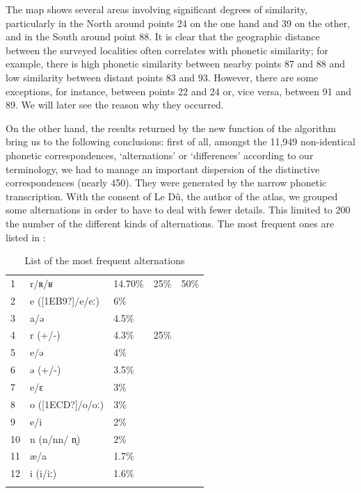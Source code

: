 \documentclass[output=paper]{LSP/langsci}
\begin{document}
The map shows several areas involving significant degrees of similarity, particularly in the North around points 24 on the one hand and 39 on the other, and in the South around point 88. It is clear that the geographic distance between the surveyed localities often correlates with phonetic similarity; for example, there is high phonetic similarity between nearby points 87 and 88 and low similarity between distant points 83 and 93. However, there are some exceptions, for instance, between points 22 and 24 or, vice versa, between 91 and 89. We will later see the reason why they occurred.

On the other hand, the results returned by the new function of the algorithm bring us to the following conclusions: first of all, amongst the 11,949 non-identical phonetic correspondences, ‘alternations’ or ‘differences’ according to our terminology, we had to manage an important dispersion of the distinctive correspondences (nearly 450). They were generated by the narrow phonetic transcription. With the consent of Le Dû, the author of the atlas, we grouped some alternations in order to have to deal with fewer details. This limited to 200 the number of the different kinds of alternations. The most frequent ones are listed in :

\begin{table}
\begin{tabular}{lllll}
\lsptoprule
\hhline{~-~~~}
{ 1

} & { r/ʀ/ʁ

} & 14.70\% & 25\% & 50\%\\
\hhline{~-~~~}
 2 & e ([1EB9?]/e/eː) & 6\% &  & \\
 3 & a/ə & 4.5\% &  & \\
 4 & r (+/-) & 4.3\% & 25\% & \\
\hhline{~-~~~}
 5 & e/ə & 4\% &  & \\
\hhline{~-~~~}
 6 & ə (+/-) & 3.5\% &  & \\
 7 & e/ɛ & 3\% &  & \\
 8 & o ([1ECD?]/o/oː) & 3\% &  & \\
 9 & e/i & 2\% &  & \\
 10 & n (n/nn/ n̩) & 2\% &  & \\
 11 & æ/a & 1.7\% &  & \\
 12 & i (i/iː) & 1.6\% &  & \\
\lspbottomrule
\end{tabular}
\caption{List of the most frequent alternations}
\label{tab:4}
\end{table}
\end{document}
